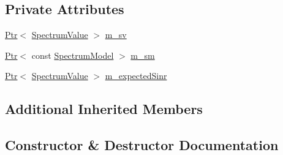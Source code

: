 \subsection*{Private Attributes}
\begin{DoxyCompactItemize}
\item 
\hyperlink{classns3_1_1Ptr}{Ptr}$<$ \hyperlink{classns3_1_1SpectrumValue}{Spectrum\+Value} $>$ \hyperlink{classLteDownlinkCtrlSinrTestCase_a7c94e9a4f3c92b0d88e165916f718a6d}{m\+\_\+sv}
\item 
\hyperlink{classns3_1_1Ptr}{Ptr}$<$ const \hyperlink{classns3_1_1SpectrumModel}{Spectrum\+Model} $>$ \hyperlink{classLteDownlinkCtrlSinrTestCase_a5778fea6faf53e8d6a3dc20c178c8a62}{m\+\_\+sm}
\item 
\hyperlink{classns3_1_1Ptr}{Ptr}$<$ \hyperlink{classns3_1_1SpectrumValue}{Spectrum\+Value} $>$ \hyperlink{classLteDownlinkCtrlSinrTestCase_a0ae82f18c62d462c2f5a88a9ac9aa0e4}{m\+\_\+expected\+Sinr}
\end{DoxyCompactItemize}
\subsection*{Additional Inherited Members}


\subsection{Constructor \& Destructor Documentation}
